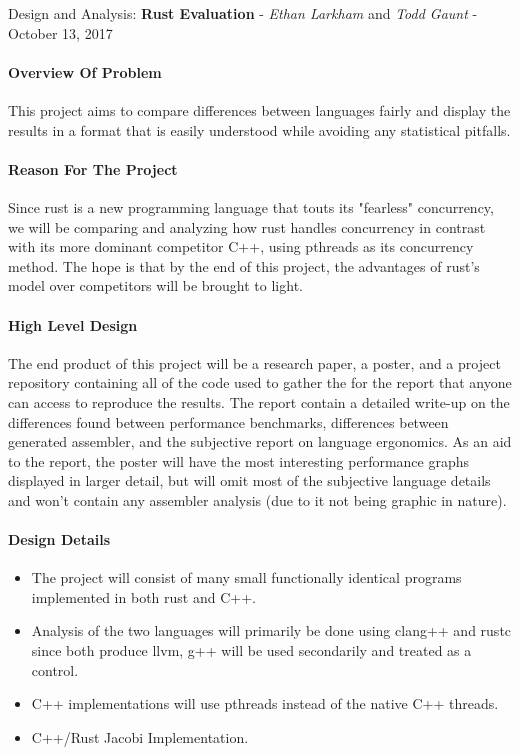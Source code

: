 \documentclass[10pt,a4paper]{report}
\begin{document}
\begin{center}
	{\Large Design and Analysis: {\bfseries Rust Evaluation}}
	- {\large{\itshape Ethan Larkham} and {\itshape Todd Gaunt}}
	- {\large October 13, 2017}
\end{center}
\vspace{0.5em}
\paragraph{Overview Of Problem}
This project aims to compare differences between languages fairly
and display the results in a format that is easily understood while avoiding
any statistical pitfalls.
\paragraph{Reason For The Project}
Since rust is a new programming language that touts its "fearless" concurrency,
we will be comparing and analyzing how rust handles concurrency in contrast
with its more dominant competitor C++, using pthreads as its concurrency method.
The hope is that by the end of this project, the advantages of rust's
model over competitors will be brought to light.
\paragraph{High Level Design}
The end product of this project will be a research paper, a poster, and a
project repository containing all of the code used to gather the for the report
that anyone can access to reproduce the results. The report contain a detailed
write-up on the differences found between performance benchmarks, differences
between generated assembler, and the subjective report on language ergonomics.
As an aid to the report, the poster will have the most interesting performance
graphs displayed in larger detail, but will omit most of the subjective
language details and won't contain any assembler analysis (due to it not being
graphic in nature).
\paragraph{Design Details}
\begin{flushleft}
	\begin{itemize}
		\item The project will consist of many small functionally
			identical programs implemented in both rust and C++.
		\item Analysis of the two languages will primarily be done using clang++
			and rustc since both produce llvm, g++ will be used secondarily and
			treated as a control.
		\item C++ implementations will use pthreads instead of the native C++
			threads.
		\item C++/Rust Jacobi Implementation.
	\end{itemize}
\end{flushleft}
\end{document}
